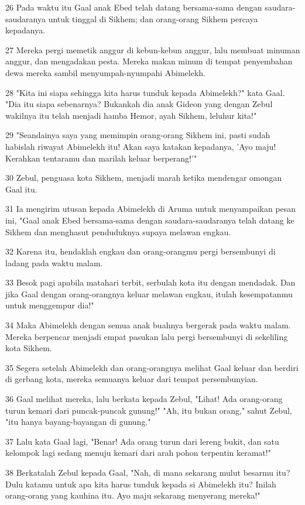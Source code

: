 \par 26 Pada waktu itu Gaal anak Ebed telah datang bersama-sama dengan saudara-saudaranya untuk tinggal di Sikhem; dan orang-orang Sikhem percaya kepadanya.
\par 27 Mereka pergi memetik anggur di kebun-kebun anggur, lalu membuat minuman anggur, dan mengadakan pesta. Mereka makan minum di tempat penyembahan dewa mereka sambil menyumpah-nyumpahi Abimelekh.
\par 28 "Kita ini siapa sehingga kita harus tunduk kepada Abimelekh?" kata Gaal. "Dia itu siapa sebenarnya? Bukankah dia anak Gideon yang dengan Zebul wakilnya itu telah menjadi hamba Hemor, ayah Sikhem, leluhur kita!"
\par 29 "Seandainya saya yang memimpin orang-orang Sikhem ini, pasti sudah habislah riwayat Abimelekh itu! Akan saya katakan kepadanya, 'Ayo maju! Kerahkan tentaramu dan marilah keluar berperang!'"
\par 30 Zebul, penguasa kota Sikhem, menjadi marah ketika mendengar omongan Gaal itu.
\par 31 Ia mengirim utusan kepada Abimelekh di Aruma untuk menyampaikan pesan ini, "Gaal anak Ebed bersama-sama dengan saudara-saudaranya telah datang ke Sikhem dan menghasut penduduknya supaya melawan engkau.
\par 32 Karena itu, hendaklah engkau dan orang-orangmu pergi bersembunyi di ladang pada waktu malam.
\par 33 Besok pagi apabila matahari terbit, serbulah kota itu dengan mendadak. Dan jika Gaal dengan orang-orangnya keluar melawan engkau, itulah kesempatanmu untuk menggempur dia!"
\par 34 Maka Abimelekh dengan semua anak buahnya bergerak pada waktu malam. Mereka berpencar menjadi empat pasukan lalu pergi bersembunyi di sekeliling kota Sikhem.
\par 35 Segera setelah Abimelekh dan orang-orangnya melihat Gaal keluar dan berdiri di gerbang kota, mereka semuanya keluar dari tempat persembunyian.
\par 36 Gaal melihat mereka, lalu berkata kepada Zebul, "Lihat! Ada orang-orang turun kemari dari puncak-puncak gunung!" "Ah, itu bukan orang," sahut Zebul, "itu hanya bayang-bayangan di gunung."
\par 37 Lalu kata Gaal lagi, "Benar! Ada orang turun dari lereng bukit, dan satu kelompok lagi sedang menuju kemari dari arah pohon terpentin keramat!"
\par 38 Berkatalah Zebul kepada Gaal, "Nah, di mana sekarang mulut besarmu itu? Dulu katamu untuk apa kita harus tunduk kepada si Abimelekh itu? Inilah orang-orang yang kauhina itu. Ayo maju sekarang menyerang mereka!"
